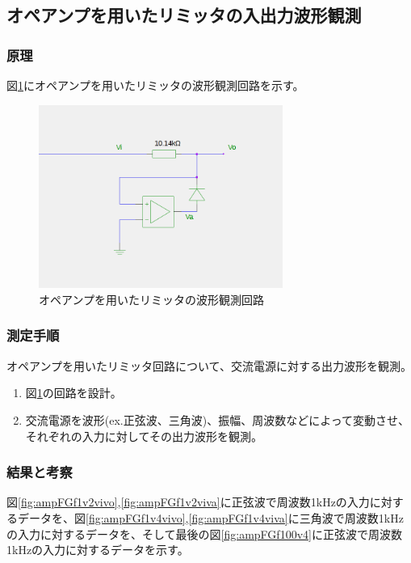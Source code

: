 \documentclass[11pt,a4j]{jsarticle}
\begin{document}
    
  \subsection{オペアンプを用いたリミッタの入出力波形観測}
   \subsubsection{原理}
    
    図\ref{fig:amp_wave}にオペアンプを用いたリミッタの波形観測回路を示す。
    
    \begin{figure}[htbp]
  \centering
  \includegraphics[width=8cm,clip]{amp_wave.png}
  \caption{オペアンプを用いたリミッタの波形観測回路}
  \label{fig:amp_wave}
 \end{figure}%
    
   \subsubsection{測定手順}
    オペアンプを用いたリミッタ回路について、交流電源に対する出力波形を観測。
    \begin{enumerate}
    \item 図\ref{fig:amp_wave}の回路を設計。
    \item 交流電源を波形(ex.正弦波、三角波)、振幅、周波数などによって変動させ、それぞれの入力に対してその出力波形を観測。
    \end{enumerate}
    
   \subsubsection{結果と考察}
    図\ref{fig:ampFGf1v2vivo},\ref{fig:ampFGf1v2viva}に正弦波で周波数1kHzの入力に対するデータを、図\ref{fig:ampFGf1v4vivo},\ref{fig:ampFGf1v4viva}に三角波で周波数1kHzの入力に対するデータを、そして最後の図\ref{fig:ampFGf100v4}に正弦波で周波数1kHzの入力に対するデータを示す。
    
\end{document}
